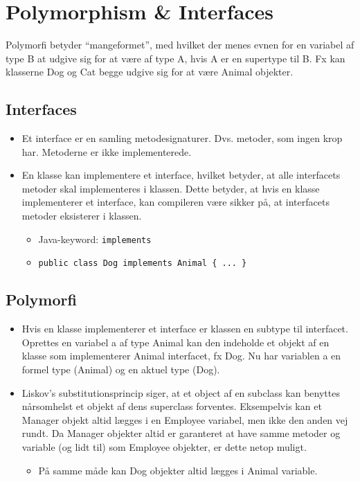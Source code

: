 \section{Polymorphism \& Interfaces}

Polymorfi betyder “mangeformet”, med hvilket der menes evnen for en variabel af type B at udgive sig for at være af type A, hvis A er en supertype til B. Fx kan klasserne Dog og Cat begge udgive sig for at være Animal objekter.

\subsection{Interfaces}

\begin{itemize}
  \item Et interface er en samling metodesignaturer. Dvs. metoder, som ingen krop har. Metoderne er ikke implementerede.
  \item En klasse kan implementere et interface, hvilket betyder, at alle interfacets metoder skal implementeres i klassen. Dette betyder, at hvis en klasse implementerer et interface, kan compileren være sikker på, at interfacets metoder eksisterer i klassen.
  \begin{itemize}
    \item Java-keyword: \verb|implements|
    \item \verb|public class Dog implements Animal { ... }|
  \end{itemize}
\end{itemize}

\subsection{Polymorfi}

\begin{itemize}
  \item Hvis en klasse implementerer et interface er klassen en subtype til interfacet. Oprettes en variabel a af type Animal kan den indeholde et objekt af en klasse som implementerer Animal interfacet, fx Dog. Nu har variablen a en formel type (Animal) og en aktuel type (Dog).
  \item Liskov’s substitutionsprincip siger, at et object af en subclass kan benyttes nårsomhelst et objekt af dens superclass forventes. Eksempelvis kan et Manager objekt altid lægges i en Employee variabel, men ikke den anden vej rundt. Da Manager objekter altid er garanteret at have samme metoder og variable (og lidt til) som Employee objekter, er dette netop muligt.
  \begin{itemize}
    \item På samme måde kan Dog objekter altid lægges i Animal variable.
  \end{itemize}
\end{itemize}

